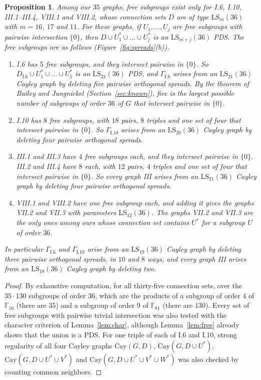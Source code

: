 \documentclass[11pt]{amsart}
\newtheorem{proposition}[theorem]{Proposition}
\theoremstyle{definition}
\newcommand{\F}{\mathbb{F}}
\newcommand{\Cay}{\mathrm{Cay}}
\newcommand{\LS}{\mathrm{LS}}
\begin{document}
\begin{proposition}\label{prop:spreads}
Among our $35$ graphs, free subgroups exist only for I.6, I.10, III.1--III.4, VIII.1 and VIII.2, whose connection sets $D$ are of type $\LS_m(36)$ with $m=16$, $17$ and $11$. For these graphs, if $U_1,\dots,U_j$ are free subgroups with pairwise intersection $\{0\}$, then $D\cup U_1^*\cup\dots\cup U_j^*$ is an $\LS_{m+j}(36)$ PDS. The free subgroups are as follows (Figure~\ref{fig:spreads}(b)).
\begin{enumerate}
\item I.6 has $5$ free subgroups, and they intersect pairwise in $\{0\}$. So $D_{\mathrm{I.6}}\cup U_1^*\cup\dots\cup U_5^*$ is an $\LS_{21}(36)$ PDS, and $\Gamma_{\mathrm{I.6}}$ arises from an $\LS_{21}(36)$ Cayley graph by deleting five pairwise orthogonal spreads. By the theorem of Bailey and Jungnickel (Section~\ref{sec:known}), five is the largest possible number of subgroups of order $36$ of $G$ that intersect pairwise in $\{0\}$.
\item I.10 has $8$ free subgroups, with $18$ pairs, $8$ triples and one set of four that intersect pairwise in $\{0\}$. So $\Gamma_{\mathrm{I.10}}$ arises from an $\LS_{20}(36)$ Cayley graph by deleting four pairwise orthogonal spreads.
\item III.1 and III.3 have $4$ free subgroups each, and they intersect pairwise in $\{0\}$. III.2 and III.4 have $8$ each, with $12$ pairs, $4$ triples and one set of four that intersect pairwise in $\{0\}$. So every graph III arises from an $\LS_{21}(36)$ Cayley graph by deleting four pairwise orthogonal spreads.
\item VIII.1 and VIII.2 have one free subgroup each, and adding it gives the graphs VII.2 and VII.3 with parameters $\LS_{12}(36)$. The graphs VII.2 and VII.3 are the only ones among ours whose connection set contains $U^*$ for a subgroup $U$ of order $36$.
\end{enumerate}
In particular $\Gamma_{\mathrm{I.6}}$ and $\Gamma_{\mathrm{I.10}}$ arise from an $\LS_{19}(36)$ Cayley graph by deleting three pairwise orthogonal spreads, in $10$ and $8$ ways, and every graph III arises from an $\LS_{19}(36)$ Cayley graph by deleting two.
\end{proposition}

\begin{proof}
By exhaustive computation, for all thirty-five connection sets, over the $35\cdot130$ subgroups of order $36$, which are the products of a subgroup of order $4$ of $\F_{16}$ (there are $35$) and a subgroup of order $9$ of $\F_{81}$ (there are $130$). Every set of free subgroups with pairwise trivial intersection was also tested with the character criterion of Lemma~\ref{lem:char}, although Lemma~\ref{lem:free} already shows that the union is a PDS. For one triple of each of I.6 and I.10, strong regularity of all four Cayley graphs $\Cay(G,D)$, $\Cay(G,D\cup U^*)$, $\Cay(G,D\cup U^*\cup V^*)$ and $\Cay(G,D\cup U^*\cup V^*\cup W^*)$ was also checked by counting common neighbors.
\end{proof}
\end{document}
